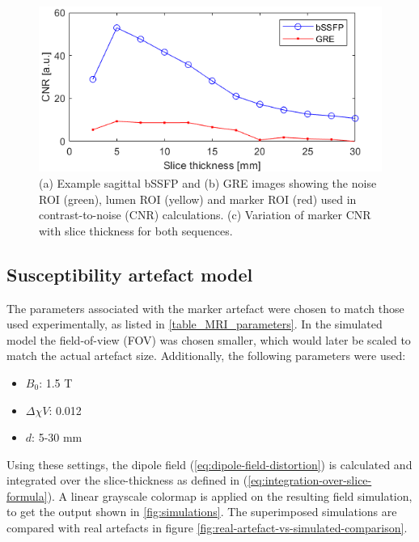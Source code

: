 \documentclass[conference]{IEEEtran}
\begin{document}
\begin{figure}
\begin{minipage}{0.241\textwidth}
    \end{minipage}\hfill \hspace*{0cm}
    \begin{minipage}{0.48\textwidth}
        \centering
        \includegraphics[width=\textwidth]{Conference/img/CNR-comparison2.png}
    \end{minipage}\hfill \hspace*{0cm}
    \caption{(a) Example sagittal bSSFP and (b) GRE images showing the noise ROI (green), lumen ROI (yellow) and marker ROI (red) used in contrast-to-noise (CNR) calculations. (c) Variation of marker CNR with slice thickness for both sequences.}
    \label{fig:MRI-sequence-optimization}
\end{figure}

\subsection{Susceptibility artefact model}

The parameters associated with the marker artefact were chosen to match those used experimentally, as listed in \autoref{table_MRI_parameters}. In the simulated model the field-of-view (FOV) was chosen smaller, which would later be scaled to match the actual artefact size. Additionally, the following parameters were used:
\begin{itemize} 
    \item \(B_0\): 1.5 T
    \item \(\Delta{\chi} V\): 0.012
    \item \(d\): 5-30 mm
\end{itemize}

Using these settings, the dipole field (\autoref{eq:dipole-field-distortion}) is calculated and integrated over the slice-thickness as defined in (\autoref{eq:integration-over-slice-formula}). A linear grayscale colormap is applied on the resulting field simulation, to get the output shown in \autoref{fig:simulations}. The superimposed simulations are compared with real artefacts in figure \autoref{fig:real-artefact-vs-simulated-comparison}.
\end{document}
